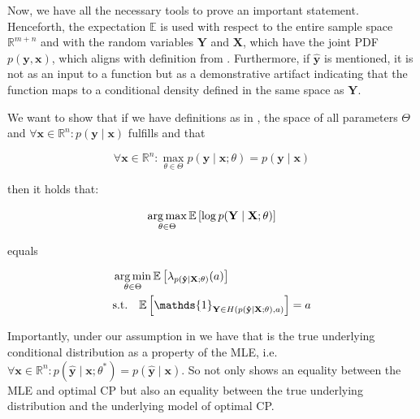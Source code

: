 Now, we have all the necessary tools to prove an important statement. Henceforth, the expectation $\mathbb{E}$ is used with respect to the entire sample space $\mathbb{R}^{m+n}$ and with the random variables $\mathbf{Y}$ and $\mathbf{X}$, which have the joint PDF $p(\mathbf{y}, \mathbf{x})$, which aligns with definition from . Furthermore, if $\mathbf{\hat{y}}$ is mentioned, it is not as an input to a function but as a demonstrative artifact indicating that the function maps to a conditional density defined in the same space as $\mathbf{Y}$.

\begin{theorem}\label{thm:optimal_cp}
    We want to show that if we have definitions as in , the space of all parameters $\Theta$ and $\forall \mathbf{x}\in\mathbb{R}^n: p(\mathbf{y}\mid \mathbf{x})$ fulfills  and that

    \begin{equation}
        \forall \mathbf{x}\in \mathbb{R}^n: \max_{\theta \in \Theta} p(\mathbf{y} \mid \mathbf{x}; \theta) = p(\mathbf{y} \mid \mathbf{x})
        \label{eq:assn_mle_is_true}
    \end{equation}

    then it holds that:

    \begin{equation}
        \operatorname*{arg\,max}_{\theta \in \Theta}  \mathbb{E} \left[ \log
            p(\mathbf{Y} \mid \mathbf{X}; \theta) \right]
        \label{eq:maximum_log_likelihood}
    \end{equation}

    equals

    \begin{align}
         & \argmin_{\theta \in \Theta} \mathbb{E} \left[
            \lambda_{p(\mathbf{\hat{y}}\mid\mathbf{X}; \theta)}( a)
        \right]                                          \\
         & \text{s.t.} \quad \mathbb{E} \left[
        \mathds{1}_{\mathbf{Y} \in
        H(p(\mathbf{\hat{y}} \mid \mathbf{X}; \theta), a)} \right]
        = a
    \end{align}

\end{theorem}

Importantly, under our assumption in  we have that  is the true underlying conditional distribution as a property of the MLE, i.e.\ $\forall \mathbf{x}\in\mathbb{R}^n: p(\mathbf{\hat{y}}\mid\mathbf{x}; \theta^*) = p(\mathbf{\hat{y}}\mid\mathbf{x})$. So  not only shows an equality between the MLE and optimal CP but also an equality between the true underlying distribution and the underlying model of optimal CP.\@

